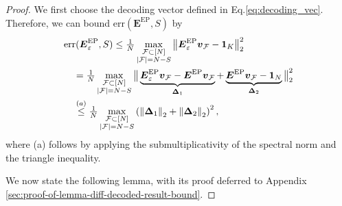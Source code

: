 \documentclass[lettersize,journal]{IEEEtran}
\renewcommand{\v}{\boldsymbol{v}}
\newcommand{\err}[1]{\mathrm{err}(#1, S)}
\newcommand{\norm}[1]{\left\lVert#1\right\rVert}
\newcommand{\ones}[1]{\boldsymbol{1}_{#1}}
\newcommand{\F}{\mathcal{F}}
\newcommand{\GEP}{\boldsymbol{E}^{\mathrm{EP}}}
\renewcommand{\a}{\boldsymbol{a}}
\begin{document}
\begin{proof} We first choose the decoding vector defined in Eq.\eqref{eq:decoding_vec}.
Therefore, we can bound $\err{\GEP}$ by
\begin{align}
    &\err{\GEP_\varepsilon}
    \le \tfrac{1}{N}\max_{\substack{\F\subset [N]\\ |\F| = N-S}}\big\|\GEP_{\varepsilon}\v_\F - \ones{K}\big\|_2^2\notag\\
     &\quad= \tfrac{1}{N}\max_{\substack{\F\subset [N]\\ |\F| = N-S}}
       \big\|
           \underbrace{\GEP_{\varepsilon}\v_\F - \GEP\v_\F}_{\boldsymbol{\Delta}_1}
           + 
           \underbrace{\GEP\v_\F - \ones{N}}_{\boldsymbol{\Delta}_2}
       \big\|_2^2
     \notag\\
     &\quad\overset{(a)}{\le}
       \tfrac{1}{N}\max_{\substack{\F\subset [N]\\ |\F| = N-S}}
       \left(
           \norm{\boldsymbol{\Delta}_1}_2 + \norm{\boldsymbol{\Delta}_2}_2
       \right)^2,
     \label{eq:error-upperbound-decomposition}
\end{align}
where (a) follows by applying the submultiplicativity of the spectral
norm and the triangle inequality.

We now state the following lemma, with its proof deferred to Appendix \ref{sec:proof-of-lemma-diff-decoded-result-bound}.


\end{proof}
\end{document}
